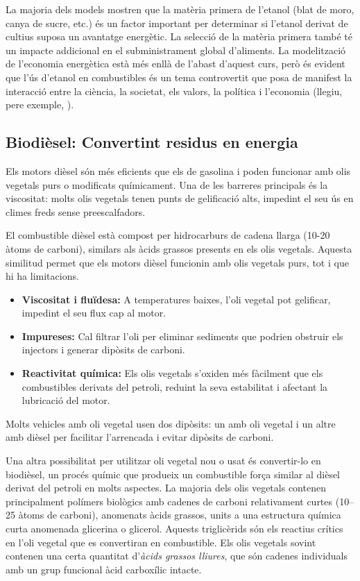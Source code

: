 La majoria dels models mostren que la matèria primera de l'etanol (blat de moro, canya de sucre, etc.) és un factor important per determinar si l'etanol derivat de cultius suposa un avantatge energètic. La selecció de la matèria primera també té un impacte addicional en el subministrament global d'aliments. La modelització de l'economia energètica està més enllà de l'abast d'aquest curs, però és evident que l'ús d'etanol en combustibles és un tema controvertit que posa de manifest la interacció entre la ciència, la societat, els valors, la política i l'economia (llegiu, pere exemple, \cite{baird_environmental_2012}).  

\subsection{Biodièsel: Convertint residus en energia}

Els motors dièsel són més eficients que els de gasolina i poden funcionar amb olis vegetals purs o modificats químicament. Una de les barreres principals és la viscositat: molts olis vegetals tenen punts de gelificació alts, impedint el seu ús en climes freds sense preescalfadors.  

El combustible dièsel està compost per hidrocarburs de cadena llarga (10-20 àtoms de carboni), similars als àcids grassos presents en els olis vegetals. Aquesta similitud permet que els motors dièsel funcionin amb olis vegetals purs, tot i que hi ha limitacions.  
\begin{itemize}
    \item \textbf{Viscositat i fluïdesa:} A temperatures baixes, l'oli vegetal pot gelificar, impedint el seu flux cap al motor.
    \item \textbf{Impureses:} Cal filtrar l'oli per eliminar sediments que podrien obstruir els injectors i generar dipòsits de carboni.
    \item \textbf{Reactivitat química:} Els olis vegetals s'oxiden més fàcilment que els combustibles derivats del petroli, reduint la seva estabilitat i afectant la lubricació del motor.
\end{itemize}

Molts vehicles amb oli vegetal usen dos dipòsits: un amb oli vegetal i un altre amb dièsel per facilitar l'arrencada i evitar dipòsits de carboni.

Una altra possibilitat per utilitzar oli vegetal nou o usat és convertir-lo en biodièsel, un procés químic que produeix un combustible força similar al dièsel derivat del petroli en molts aspectes. La majoria dels olis vegetals contenen principalment polímers biològics amb cadenes de carboni relativament curtes (10–25 àtoms de carboni), anomenats àcids grassos, units a una estructura química curta anomenada glicerina o glicerol. Aquests triglicèrids són els reactius crítics en l'oli vegetal que es convertiran en combustible. Els olis vegetals sovint contenen una certa quantitat d'\textit{àcids grassos lliures}, que són cadenes individuals amb un grup funcional àcid carboxílic intacte.


